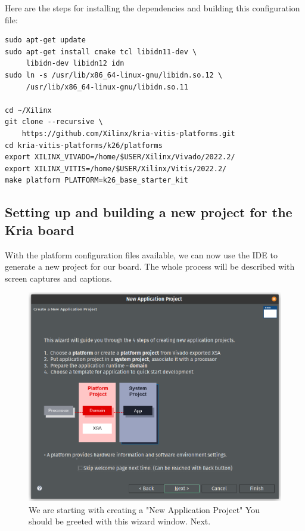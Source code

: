 \documentclass[10pt]{article}
\begin{document}
Here are the steps for installing the dependencies and building this configuration file:

\begin{verbatim}
sudo apt-get update
sudo apt-get install cmake tcl libidn11-dev \
     libidn-dev libidn12 idn
sudo ln -s /usr/lib/x86_64-linux-gnu/libidn.so.12 \
     /usr/lib/x86_64-linux-gnu/libidn.so.11

cd ~/Xilinx
git clone --recursive \
    https://github.com/Xilinx/kria-vitis-platforms.git
cd kria-vitis-platforms/k26/platforms
export XILINX_VIVADO=/home/$USER/Xilinx/Vivado/2022.2/
export XILINX_VITIS=/home/$USER/Xilinx/Vitis/2022.2/
make platform PLATFORM=k26_base_starter_kit
\end{verbatim}

\subsection{Setting up and building a new project for the Kria board}
\label{sec:org2e4066a}
With the platform configuration files available, we can now use the IDE to generate a
new project for our board. The whole process will be described with screen captures and
captions.

\begin{figure}[htbp]
\centering
\includegraphics[width=.6\textwidth]{./img/vitis_new/project1.png}
\caption{\label{fig:orgdf3cd6a}We are starting with creating a "New Application Project" You should be greeted with this wizard window. Next.}
\end{figure}
\end{document}
